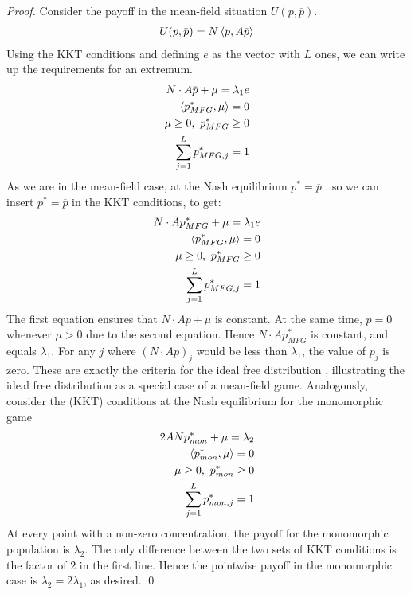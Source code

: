 \begin{proof}
Consider the payoff in the mean-field situation $U(p,\overbar{p})$.
\begin{align}
  U(p, \overbar{p}) = N \ip{p}{A\overbar{p}}
\end{align}
Using the KKT conditions and defining $e$ as the vector with $L$ ones, we can write up the requirements for an extremum.
\begin{equation}
  \begin{split}
    N \cdot A\overbar{p} + \mu = \lambda_1 e \\
    \ip{p^*_{MFG}}{\mu} = 0 \\
    \mu \geq 0,~p^*_{MFG} \geq 0 \\
    \sum_{j=1}^L p^*_{MFG,j} = 1
  \end{split}
\end{equation}
As we are in the mean-field case, at the Nash equilibrium $p^* = \overbar{p}$ .
so we can insert $p^*=\overbar{p}$ in the KKT conditions, to get:
\begin{equation}
  \begin{split}
    N \cdot Ap_{MFG}^* + \mu =  \lambda_1 e \\
    \left \langle p^*_{MFG},\mu \right \rangle = 0 \\
    \mu \geq 0,~p^*_{MFG} \geq 0 \\
    \sum_{j=1}^L p^*_{MFG,j} = 1
  \end{split}
\end{equation}
The first equation ensures that $N\cdot Ap + \mu$ is constant. At the same time, $p=0$ whenever $\mu > 0$ due to the second equation. Hence $N\cdot Ap^*_{MFG}$ is constant, and equals $\lambda_1$. For any $j$ where $(N\cdot Ap)_j$ would be less than $\lambda_1$, the value of $p_j$ is zero.
These are exactly the criteria for the ideal free distribution \citep{fretwell1969territorial}, illustrating the ideal free distribution as a special case of a mean-field game.
Analogously, consider the (KKT) conditions at the Nash equilibrium for the monomorphic game
\begin{equation}
  \begin{split}
    2ANp^*_{mon} + \mu = \lambda_2  \\
    \left \langle p^*_{mon},\mu \right \rangle = 0 \\
    \mu \geq 0,~p_{mon}^* \geq 0 \\
    \sum_{j=1}^L p^*_{mon,j} = 1
  \end{split}
\end{equation}
At every point with a non-zero concentration, the payoff for the monomorphic population is $\lambda_2$. The only difference between the two sets of KKT conditions is the factor of $2$ in the first line. Hence the pointwise payoff in the monomorphic case is $\lambda_2 = 2\lambda_1$, as desired.
\qed
\end{proof}
